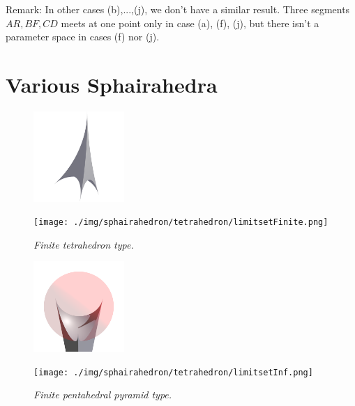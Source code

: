 \documentclass[dvipdfmx]{interact}
\theoremstyle{plain}%
\theoremstyle{definition}
\theoremstyle{remark}
\theoremstyle{problemstyle}
\begin{document}
Remark:
In other cases (b),...,(j), we don't have a similar result. Three
segments $AR, BF, CD$ meets at one point only in case (a), (f), (j), but
there isn't a parameter space in cases (f) nor (j).


\section{Various Sphairahedra}

\begin{figure}[H]
 \begin{minipage}{0.5\textwidth}
  \begin{minipage}[t]{0.24\textwidth}
   \centering
   \includegraphics[width=1.35in, height=1.35in, keepaspectratio]{./img/sphairahedron/tetrahedron/sphairahedronFinite.png}
  \end{minipage}
  \hspace*{\fill}
  \begin{minipage}[t]{0.24\textwidth}
   \centering
   \texttt{[image: ./img/sphairahedron/tetrahedron/limitsetFinite.png]}
  \end{minipage}
  \hspace*{\fill}
  \caption{\textit{Finite tetrahedron type.}}
  \label{fig:tetrahedronFinite}
 \end{minipage}
 \hspace*{\fill}
 \begin{minipage}{0.5\textwidth}
  \begin{minipage}[t]{0.24\textwidth}
   \centering
   \includegraphics[width=1.35in, height=1.35in, keepaspectratio]{./img/sphairahedron/tetrahedron/sphairahedronInf.png}
  \end{minipage}
  \hspace*{\fill}
  \begin{minipage}[t]{0.24\textwidth}
   \centering
   \texttt{[image: ./img/sphairahedron/tetrahedron/limitsetInf.png]}
  \end{minipage}
  \hspace*{\fill}
  \caption{\textit{Finite pentahedral pyramid type.}}
  \label{fig:tetrahedronInf}
 \end{minipage}
\end{figure}
\end{document}
